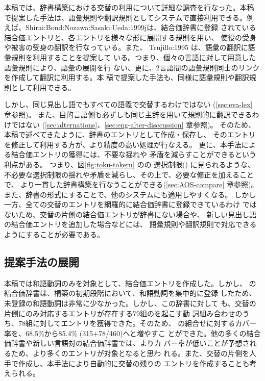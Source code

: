 \documentclass[japanese]{jnlp}
\newcommand{\izj}[1]{}
\newcommand{\ix}{}
\newcommand{\soalt}{}
\newcommand{\citet}{}
\newcommand{\altje}{}
\def\mpt#1{}
\renewcommand{\mpt}[1]{}
\newcommand{\tot}{}
\begin{document}
本稿では、辞書構築における交替の利用について詳細な調査を行なった。本稿
で提案した手法は、語彙規則や翻訳規則としてシステムで直接利用できる。例
えば、\citet{Shirai:Bond:Nozawa:Sasaki:Ueda:1999j}は、結合価辞書に登録
されている結合価エントリと、各エントリを様々な形に展開する規則を用い、
使役の受身や被害の受身の翻訳を行なっている。また、
\citet{Trujillo:1995} は、語彙の翻訳に語彙規則を利用することを提案して
いる。つまり、個々の言語に対して用意した語彙規則により、語彙の展開を行
ない、更に、2言語間の語彙規則同士のリンクを作成して翻訳に利用する。本
稿で提案した手法も、同様に語彙規則や翻訳規則として利用できる。


しかし、同じ見出し語でもすべての語義で交替するわけではない
(\ref{sec:eva-lex} 章参照)。
また、目的言語側も必ずしも同じ主辞を用いて規則的に翻訳できるわけではない
(\ref{sec:alternations}、\ref{sec:eng-alter-disccussion} 章参照)。
そのため、本稿で述べてきたように、辞書のエントリとして作成・保存し、
そのエントリを修正して利用する方が、より精度の高い処理が行なえる。
更に、本手法による結合価エントリの獲得には、不要な揺れや
矛盾を減らすことができるという利点がある。
つまり、図\ref{fig:toku-tokeru} の\ix{}の
選択制限(\izj{具体物}\tot \izj{無生物})
に見られるような、
不必要な選択制限の揺れや矛盾を減らし、その上で、必要な修正を加えることで、
より一貫した辞書構築を行なうことができる(\ref{sec:AOS-compare} 章参照)。
また、辞書の形式にすることで、他のシステムにも適用しやすくなる。
しかし一方、全ての交替のエントリを網羅的に結合価辞書に登録できているわけ
ではないため、交替の片側の結合価エントリが辞書にない場合や、
新しい見出し語の結合価エントリを追加した場合などには、
語彙規則や翻訳規則で対応できるようにすることが必要である。


\subsection{提案手法の展開} 

\mpt{作成した数が少なかった原因}


本稿では和語動詞のみを対象として、結合価エントリを作成した。しかし、
\altje の結合価辞書は、構築の初期段階において、和語動詞を集中的に登録
したため、未登録の和語動詞は非常に少なかった。しかし、この辞書に対して
も、交替の片側にのみ対応するエントリが存在する79組の\soalt を起こす動
詞組み合わせのうち、78組に対してエントリを獲得できた。そのため、\soalt 
の組合せに対するカバー率を、68.5\%から85.4\% (315+78/460)へと増やすこ
とができた。他の多くの結合価辞書や新しい言語対の結合価辞書では、よりカ
バー率が低いことが予想されるため、より多くのエントリが対象となると思わ
れる。また、交替の片側を人手で作成し、本手法により自動的に交替の残りの
エントリを作成することも考えられる。
\end{document}
